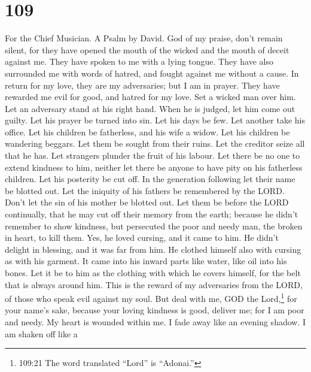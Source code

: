 \hypertarget{section-101}{%
\section{109}\label{section-101}}

For the Chief Musician. A Psalm by David.  God of my praise,
don't remain silent,  for they have opened the mouth of the
wicked and the mouth of deceit against me. They have spoken to me with a
lying tongue.  They have also surrounded me with words of
hatred, and fought against me without a cause.  In return
for my love, they are my adversaries; but I am in prayer. 
They have rewarded me evil for good, and hatred for my love.
 Set a wicked man over him. Let an adversary stand at his
right hand.  When he is judged, let him come out guilty. Let
his prayer be turned into sin.  Let his days be few. Let
another take his office.  Let his children be fatherless,
and his wife a widow.  Let his children be wandering
beggars. Let them be sought from their ruins.  Let the
creditor seize all that he has. Let strangers plunder the fruit of his
labour.  Let there be no one to extend kindness to him,
neither let there be anyone to have pity on his fatherless children.
 Let his posterity be cut off. In the generation following
let their name be blotted out.  Let the iniquity of his
fathers be remembered by the LORD. Don't let the sin of his mother be
blotted out.  Let them be before the LORD continually, that
he may cut off their memory from the earth;  because he
didn't remember to show kindness, but persecuted the poor and needy man,
the broken in heart, to kill them.  Yes, he loved cursing,
and it came to him. He didn't delight in blessing, and it was far from
him.  He clothed himself also with cursing as with his
garment. It came into his inward parts like water, like oil into his
bones.  Let it be to him as the clothing with which he
covers himself, for the belt that is always around him. 
This is the reward of my adversaries from the LORD, of those who speak
evil against my soul.  But deal with me, GOD the
Lord,\footnote{109:21 The word translated ``Lord'' is ``Adonai.''} for
your name's sake, because your loving kindness is good, deliver me;
 for I am poor and needy. My heart is wounded within me.
 I fade away like an evening shadow. I am shaken off like a
